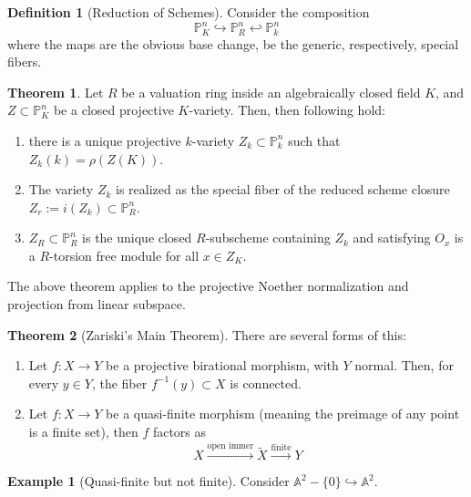 \documentclass{article}
\theoremstyle{definition}
\newtheorem{theorem}{Theorem}[section]
\theoremstyle{definition}
\newtheorem{definition}{Definition}[theorem]
\theoremstyle{definition}
\theoremstyle{definition}
\theoremstyle{definition}
\theoremstyle{definition}
\theoremstyle{definition}
\newtheorem{example}{Example}[theorem]
\begin{document}
\begin{tcolorbox}[colback=purple!5!white,colframe=purple!75!black]
\begin{definition}[Reduction of Schemes]
Consider the composition 
\[\mathbb{P}^n_K\hookrightarrow \mathbb{P}^n_R\hookleftarrow \mathbb{P}^n_k\]
where the maps are the obvious base change, be the generic, respectively, special fibers. 

\end{definition}
\end{tcolorbox}


\begin{tcolorbox}[colback=red!5!white,colframe=red!30!white]
\begin{theorem}
Let $R$ be a valuation ring inside an algebraically closed field $K$, and $Z\subset \mathbb{P}^n_K$ be a closed projective $K$-variety. Then, then following hold: 
\begin{enumerate}
    \item there is a unique projective $k$-variety $Z_k\subset \mathbb{P}^n_k$ such that $Z_k(k)=\rho(Z(K))$. 
    \item The variety $Z_k$ is realized as the special fiber of the reduced scheme closure $Z_r:=i(Z_k)\subset \mathbb{P}^n_R$.
    \item $Z_R\subset \mathbb{P}^n_R$ is the unique closed $R$-subscheme containing $Z_k$ and satisfying $O_x$ is a $R$-torsion free module for all $x\in Z_K$.
\end{enumerate}
\end{theorem}
\end{tcolorbox}
The above theorem applies to the projective Noether normalization and projection from linear subspace. 



\begin{tcolorbox}[colback=red!5!white,colframe=red!30!white]
\begin{theorem}[Zariski's Main Theorem]
There are several forms of this: 
\begin{enumerate}
    \item Let $f: X\to Y$ be a projective birational morphism, with $Y$ normal. Then, for every $y\in Y$, the fiber $f^{-1}(y)\subset X$ is connected. 
    \item Let $f: X\to Y$ be a quasi-finite morphism (meaning the preimage of any point is a finite set), then $f$ factors as 
    \[X\xrightarrow{\textrm{open immer}} \tilde{X}\xrightarrow{\textrm{finite}} Y\]
\end{enumerate}
\end{theorem}
\end{tcolorbox}


\begin{tcolorbox}[colback=yellow!5!white,colframe=yellow!30!white]
\begin{example}[Quasi-finite but not finite]
Consider $\mathbb{A}^2-\{0\}\hookrightarrow \mathbb{A}^2$. 
\end{example}
\end{tcolorbox}
\end{document}
